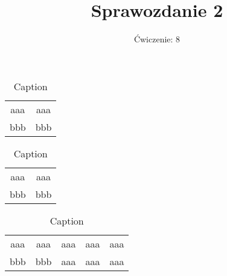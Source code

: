 \documentclass{article}
\title{Sprawozdanie 2}
\author{
Ćwiczenie: 8}
\date{}
\begin{document}
\maketitle
\begin{multicols}{3}
    \begin{table}[h]
       \centering
       \begin{tabular}{c|c}
           aaa & aaa \\
           bbb & bbb
       \end{tabular}
       \caption{Caption}
       \label{tab:my_label}
    \end{table}
    \begin{table}[h]
       \centering
       \begin{tabular}{c|c}
           aaa & aaa \\
           bbb & bbb
       \end{tabular}
       \caption{Caption}
       \label{tab:my_label}
    \end{table}
    \begin{table}[h]
       \centering
       \begin{tabular}{c|c|c|c|c|}
           aaa & aaa & aaa & aaa & aaa \\
           bbb & bbb & aaa & aaa & aaa 
       \end{tabular}
       \caption{Caption}
       \label{tab:my_label}
    \end{table}
    \end{multicols}
\end{document}
